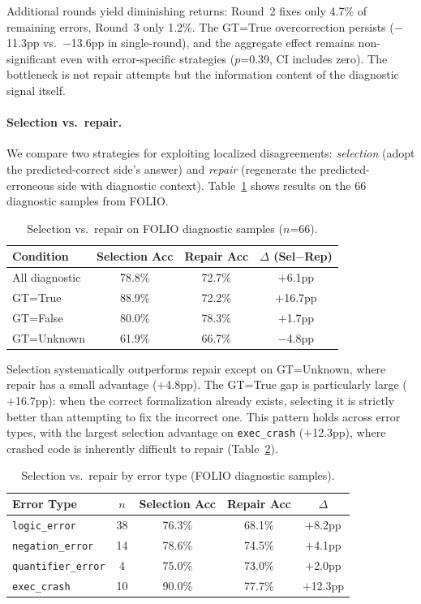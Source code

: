 \documentclass[11pt]{article}
\begin{document}
Additional rounds yield diminishing returns: Round~2 fixes only 4.7\% of remaining errors, Round~3 only 1.2\%. The GT=True overcorrection persists ($-$11.3pp vs.\ $-$13.6pp in single-round), and the aggregate effect remains non-significant even with error-specific strategies ($p$=0.39, CI includes zero). The bottleneck is not repair attempts but the information content of the diagnostic signal itself.

\paragraph{Selection vs.\ repair.} We compare two strategies for exploiting localized disagreements: \emph{selection} (adopt the predicted-correct side's answer) and \emph{repair} (regenerate the predicted-erroneous side with diagnostic context). Table~\ref{tab:sel_vs_rep} shows results on the 66 diagnostic samples from FOLIO.

\begin{table}[t]
\centering
\caption{Selection vs.\ repair on FOLIO diagnostic samples ($n$=66).}
\label{tab:sel_vs_rep}
\begin{tabular}{lccc}
\toprule
Condition & Selection Acc & Repair Acc & $\Delta$ (Sel$-$Rep) \\
\midrule
All diagnostic  & 78.8\% & 72.7\% & $+$6.1pp \\
GT=True          & 88.9\% & 72.2\% & $+$16.7pp \\
GT=False         & 80.0\% & 78.3\% & $+$1.7pp \\
GT=Unknown       & 61.9\% & 66.7\% & $-$4.8pp \\
\bottomrule
\end{tabular}
\end{table}

Selection systematically outperforms repair except on GT=Unknown, where repair has a small advantage ($+$4.8pp). The GT=True gap is particularly large ($+$16.7pp): when the correct formalization already exists, selecting it is strictly better than attempting to fix the incorrect one. This pattern holds across error types, with the largest selection advantage on \texttt{exec\_crash} ($+$12.3pp), where crashed code is inherently difficult to repair (Table~\ref{tab:sel_by_error}).

\begin{table}[t]
\centering
\caption{Selection vs.\ repair by error type (FOLIO diagnostic samples).}
\label{tab:sel_by_error}
\begin{tabular}{lcccc}
\toprule
Error Type & $n$ & Selection Acc & Repair Acc & $\Delta$ \\
\midrule
\texttt{logic\_error}      & 38 & 76.3\% & 68.1\% & $+$8.2pp \\
\texttt{negation\_error}   & 14 & 78.6\% & 74.5\% & $+$4.1pp \\
\texttt{quantifier\_error} & 4  & 75.0\% & 73.0\% & $+$2.0pp \\
\texttt{exec\_crash}       & 10 & 90.0\% & 77.7\% & $+$12.3pp \\
\bottomrule
\end{tabular}
\end{table}
\end{document}
